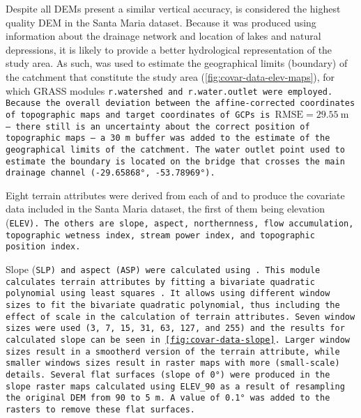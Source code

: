 Despite all DEMs present a similar vertical accuracy, \demNew{} is considered the highest quality DEM in the 
Santa Maria dataset. Because it was produced using information about the drainage network and location of lakes
and natural depressions, it is likely to provide a better hydrological representation of the study area. As 
such, \demNew{} was used to estimate the geographical limits (boundary) of the catchment that constitute the 
study area (\autoref{fig:covar-data-elev-maps}), for which GRASS modules \tt{r.watershed} and 
\tt{r.water.outlet} were employed. Because the overall deviation between the affine-corrected coordinates of 
topographic maps and target coordinates of GCPs is $\text{RMSE} = \SI{29.55}{\m}$ -- there still is an 
uncertainty about the correct position of topographic maps -- a \SI{30}{\m} buffer was added to the estimate 
of the geographical limits of the catchment. The water outlet point used to estimate the boundary is located 
on the bridge that crosses the main drainage channel (\ang{-29.65868}, \ang{-53.78969}).

Eight terrain attributes were derived from each of \demOld{} and \demNew{} to produce the covariate data 
included in the Santa Maria dataset, the first of them being elevation (\tt{ELEV}). The others are slope, 
aspect, northernness, flow accumulation, topographic wetness index, stream power index, and topographic 
position index.

Slope (\tt{SLP}) and aspect (\tt{ASP}) were calculated using . This module calculates 
terrain attributes by fitting a bivariate quadratic polynomial using least squares \cite{Wood1996}. It allows 
using different window sizes to fit the bivariate quadratic polynomial, thus including the effect of scale in 
the calculation of terrain attributes. Seven window sizes were used (3, 7, 15, 31, 63, 127, and 255) and the 
results for calculated slope can be seen in \autoref{fig:covar-data-slope}. Larger window sizes result in a 
smootherd version of the terrain attribute, while smaller windows sizes result in raster maps with more 
(small-scale) details. Several flat surfaces (slope of \ang{0}) were produced in the slope raster maps 
calculated using \tt{ELEV\_90} as a result of resampling the original DEM from \num{90} to \SI{5}{\m}. A 
value of \ang{0.1} was added to the rasters to remove these flat surfaces.

